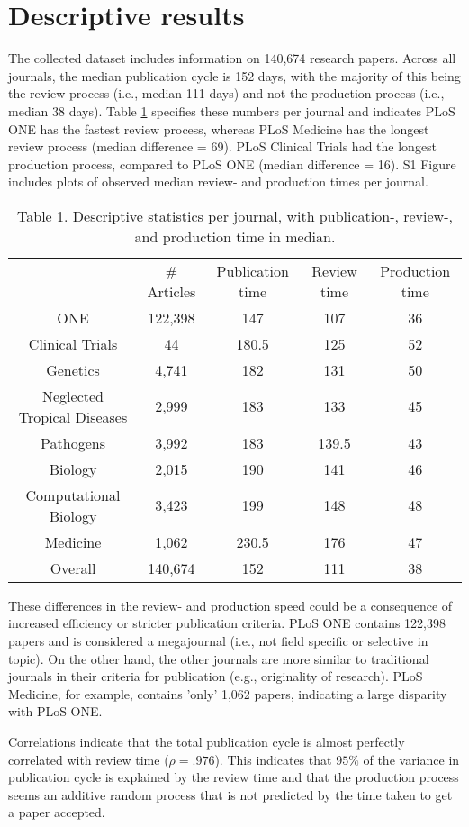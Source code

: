 \section*{Descriptive results}
The collected dataset includes information on 140,674 research papers. Across all journals, the median publication cycle is 152 days, with the majority of this being the review process (i.e., median 111 days) and not the production process (i.e., median 38 days). Table \ref{tab:tab1} specifies these numbers per journal and indicates PLoS ONE has the fastest review process, whereas PLoS Medicine has the longest review process (median difference = 69). PLoS Clinical Trials had the longest production process, compared to PLoS ONE (median difference = 16). S1 Figure includes plots of observed median review- and production times per journal. 

\begin{table}
\caption{Table 1. Descriptive statistics per journal, with publication-, review-, and production time in median.}
\label{tab:tab1}
\begin{tabular}{ c c c c c }
          & \# Articles & Publication time & Review time & Production time \\
    ONE   & 122,398 & 147   & 107   & 36 \\
    Clinical Trials & 44    & 180.5 & 125   & 52 \\
    Genetics & 4,741  & 182   & 131   & 50 \\
    Neglected Tropical Diseases & 2,999  & 183   & 133   & 45 \\
    Pathogens & 3,992  & 183   & 139.5 & 43 \\
    Biology & 2,015  & 190   & 141   & 46 \\
    Computational Biology & 3,423  & 199   & 148   & 48 \\
    Medicine & 1,062  & 230.5   & 176   & 47 \\
    Overall & 140,674 & 152   & 111   & 38 \\
\end{tabular}
\end{table}

These differences in the review- and production speed could be a consequence of increased efficiency or stricter publication criteria. PLoS ONE contains 122,398 papers and is considered a megajournal (i.e., not field specific or selective in topic). On the other hand, the other journals are more similar to traditional journals in their criteria for publication (e.g., originality of research). PLoS Medicine, for example, contains 'only' 1,062 papers, indicating a large disparity with PLoS ONE. 

Correlations indicate that the total publication cycle is almost perfectly correlated with review time ($\rho=.976$). This indicates that $95\%$ of the variance in publication cycle is explained by the review time and that the production process seems an additive random process that is not predicted by the time taken to get a paper accepted.
  